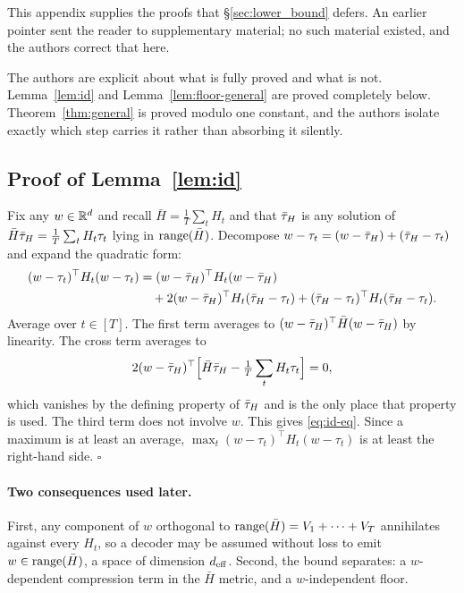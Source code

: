 This appendix supplies the proofs that \S\ref{sec:lower_bound} defers. An
earlier pointer sent the reader to supplementary material; no such material
existed, and the authors correct that here.

The authors are explicit about what is fully proved and what is not.
Lemma~\ref{lem:id} and Lemma~\ref{lem:floor-general} are proved completely
below. Theorem~\ref{thm:general} is proved modulo one constant, and the authors isolate
exactly which step carries it rather than absorbing it silently.

\subsection{Proof of Lemma~\ref{lem:id}}

Fix any $w \in \mathbb{R}^d$ and recall $\bar H = \frac1T\sum_t H_t$ and that $\bar{\tau}_H$
is any solution of $\bar H \bar{\tau}_H = \frac1T\sum_t H_t \tau_t$ lying in
$\operatorname{range}(\bar H)$. Decompose $w - \tau_t = (w - \bar{\tau}_H) + (\bar{\tau}_H - \tau_t)$ and
expand the quadratic form:
\begin{align*}
  (w-\tau_t)^\top H_t (w-\tau_t)
  &= (w-\bar{\tau}_H)^\top H_t (w-\bar{\tau}_H) \\
  &\quad + 2 (w-\bar{\tau}_H)^\top H_t (\bar{\tau}_H - \tau_t)
   + (\bar{\tau}_H-\tau_t)^\top H_t (\bar{\tau}_H-\tau_t).
\end{align*}
Average over $t \in [T]$. The first term averages to
$(w-\bar{\tau}_H)^\top \bar H (w-\bar{\tau}_H)$ by linearity. The cross term averages to
\begin{equation*}
  2 (w-\bar{\tau}_H)^\top\Bigl[\bar H \bar{\tau}_H - \tfrac1T\sum_t H_t \tau_t\Bigr] = 0,
\end{equation*}
which vanishes by the defining property of $\bar{\tau}_H$ and is the only place that
property is used. The third term does not involve $w$. This gives
\eqref{eq:id-eq}. Since a maximum is at least an average,
$\max_t (w-\tau_t)^\top H_t (w-\tau_t)$ is at least the right-hand side.
\hfill$\square$

\paragraph{Two consequences used later.} First, any component of $w$
orthogonal to $\operatorname{range}(\bar H) = V_1 + \cdots + V_T$ annihilates against every
$H_t$, so a decoder may be assumed without loss to emit
$w \in \operatorname{range}(\bar H)$, a space of dimension $d_{\mathrm{eff}}$. Second, the bound
separates: a $w$-dependent compression term in the $\bar H$ metric, and a
$w$-independent floor.

